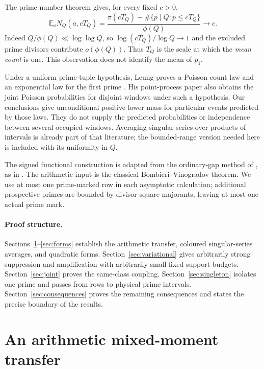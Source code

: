 \documentclass[11pt]{article}
\theoremstyle{remark}
\numberwithin{equation}{section}
\newcommand{\E}{\mathbb E}
\begin{document}
The prime number theorem gives, for every fixed $c>0$,
\begin{equation}\label{eq:firstmean}
 \E_a N_Q(a,cT_Q)
 =\frac{\pi(cT_Q)-\#\{p\mid Q:p\le cT_Q\}}{\phi(Q)}
 \longrightarrow c.
\end{equation}
Indeed $Q/\phi(Q)\ll\log\log Q$, so
$\log(cT_Q)/\log Q\to1$ and the excluded prime divisors contribute
$o(\phi(Q))$.
Thus $T_Q$ is the scale at which the \emph{mean count} is one.
This observation does not identify the mean of $p_1$.

Under a uniform prime-tuple hypothesis, Leung proves a Poisson
count law and an exponential law for the first prime
\cite{LeungMoments}. His point-process paper \cite{LeungProcess}
also obtains the joint Poisson probabilities for disjoint windows
under such a hypothesis. Our conclusions give unconditional positive
lower mass for particular events predicted by those laws. They do
not supply the predicted probabilities or independence between
several occupied windows. Averaging singular series over products
of intervals is already part of that literature; the bounded-range
version needed here is included with its uniformity in $Q$.

The signed functional construction is adapted from the ordinary-gap
method of \cite{OAI}, as in \cite{Meiji119}. The arithmetic input
is the classical Bombieri--Vinogradov theorem. We use at most one
prime-marked row in each asymptotic calculation; additional prospective primes are bounded by divisor-square
majorants, leaving at most one actual prime mark.

\paragraph{Proof structure.}
Sections~\ref{sec:mixed}--\ref{sec:forms} establish the arithmetic
transfer, coloured singular-series averages, and quadratic forms.
Section~\ref{sec:variational} gives arbitrarily strong suppression
and amplification with arbitrarily small fixed support budgets.
Section~\ref{sec:joint} proves the same-class coupling.
Section~\ref{sec:singleton} isolates one prime and passes from
rows to physical prime intervals.
Section~\ref{sec:consequences} proves the remaining consequences
and states the precise boundary of the results.


\section{An arithmetic mixed-moment transfer}\label{sec:mixed}
\end{document}
